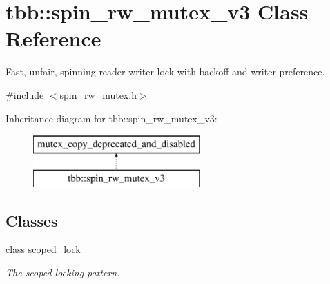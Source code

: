 \hypertarget{classtbb_1_1spin__rw__mutex__v3}{}\section{tbb\+:\+:spin\+\_\+rw\+\_\+mutex\+\_\+v3 Class Reference}
\label{classtbb_1_1spin__rw__mutex__v3}


Fast, unfair, spinning reader-\/writer lock with backoff and writer-\/preference.  




{\ttfamily \#include $<$spin\+\_\+rw\+\_\+mutex.\+h$>$}

Inheritance diagram for tbb\+:\+:spin\+\_\+rw\+\_\+mutex\+\_\+v3\+:\begin{figure}[H]
\begin{center}
\leavevmode
\includegraphics[height=2.000000cm]{classtbb_1_1spin__rw__mutex__v3}
\end{center}
\end{figure}
\subsection*{Classes}
\begin{DoxyCompactItemize}
\item 
class \hyperlink{classtbb_1_1spin__rw__mutex__v3_1_1scoped__lock}{scoped\+\_\+lock}
\begin{DoxyCompactList}\small\item\em The scoped locking pattern. \end{DoxyCompactList}\end{DoxyCompactItemize}
